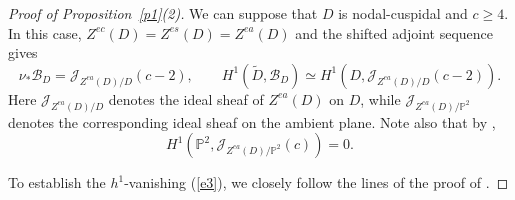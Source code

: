 \documentclass[11pt]{amsart}
\theoremstyle{definition}
\theoremstyle{remark}
\newcommand{\PP}{{\mathbb P}}
\begin{document}
\begin{proof}[Proof of Proposition~\ref{p1}(2)]
We can suppose that $D$ is nodal-cuspidal and $c\ge4$. In this case, $Z^{ec}(D)=Z^{es}(D)=Z^{ea}(D)$ and the shifted adjoint sequence gives
\[
\nu_*{\mathcal B}_D={\mathcal J}_{Z^{ea}(D)/D}(c-2),
\qquad
H^1(\widetilde D,{\mathcal B}_D)\simeq
H^1(D,{\mathcal J}_{Z^{ea}(D)/D}(c-2)).
\]
Here ${\mathcal J}_{Z^{ea}(D)/D}$ denotes the ideal sheaf of $Z^{ea}(D)$ on $D$, while ${\mathcal J}_{Z^{ea}(D)/\PP^2}$ denotes the corresponding ideal sheaf on the ambient plane. Note also that by \cite[Theorem 3.5.7]{GLS2},
\begin{equation}
H^1(\PP^2,{\mathcal J}_{Z^{ea}(D)/\PP^2}(c))=0.
\label{e5}
\end{equation}

To establish the $h^1$-vanishing (\ref{e3}), we closely follow the lines of the proof of \cite[Theorem 3.5.7]{GLS2}.


\end{proof}
\end{document}
